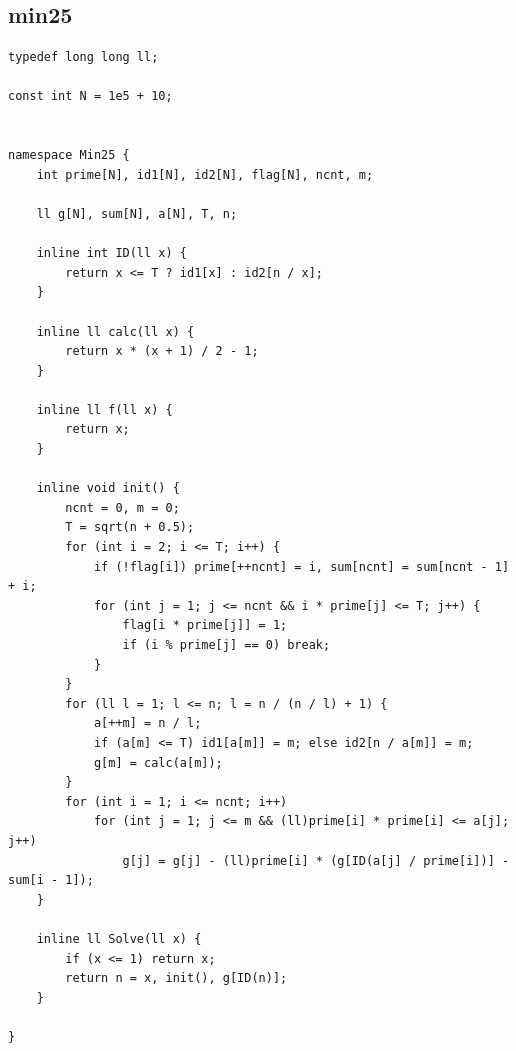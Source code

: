 \documentclass[twoside]{article}
\begin{document}
\subsection{min25}
\begin{lstlisting}
typedef long long ll;

const int N = 1e5 + 10;


namespace Min25 {
    int prime[N], id1[N], id2[N], flag[N], ncnt, m;

    ll g[N], sum[N], a[N], T, n;

    inline int ID(ll x) {
        return x <= T ? id1[x] : id2[n / x];
    }

    inline ll calc(ll x) {
        return x * (x + 1) / 2 - 1;
    }

    inline ll f(ll x) {
        return x;
    }

    inline void init() {
        ncnt = 0, m = 0;
        T = sqrt(n + 0.5);
        for (int i = 2; i <= T; i++) {
            if (!flag[i]) prime[++ncnt] = i, sum[ncnt] = sum[ncnt - 1] + i;
            for (int j = 1; j <= ncnt && i * prime[j] <= T; j++) {
                flag[i * prime[j]] = 1;
                if (i % prime[j] == 0) break;
            }
        }
        for (ll l = 1; l <= n; l = n / (n / l) + 1) {
            a[++m] = n / l;
            if (a[m] <= T) id1[a[m]] = m; else id2[n / a[m]] = m;
            g[m] = calc(a[m]);
        }
        for (int i = 1; i <= ncnt; i++)
            for (int j = 1; j <= m && (ll)prime[i] * prime[i] <= a[j]; j++)
                g[j] = g[j] - (ll)prime[i] * (g[ID(a[j] / prime[i])] - sum[i - 1]);
    }

    inline ll Solve(ll x) {
        if (x <= 1) return x;
        return n = x, init(), g[ID(n)];
    }

}
\end{lstlisting}
\end{document}
